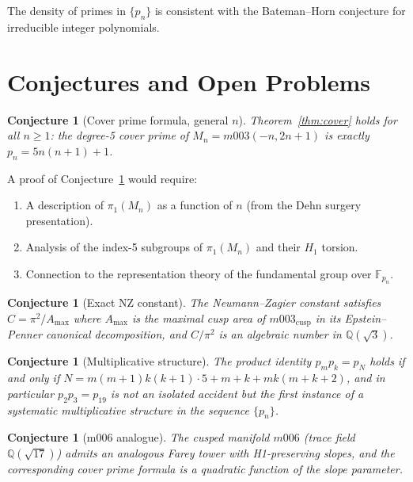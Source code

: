 \documentclass[11pt,a4paper]{article}
\newtheorem{conjecture}[theorem]{Conjecture}
\theoremstyle{definition}
\newcommand{\QQ}{\mathbb{Q}}
\newcommand{\Mn}{M_n}
\newcommand{\Mcusp}{m003_{\mathrm{cusp}}}
\begin{document}
The density of primes in $\{p_n\}$ is consistent with the
Bateman--Horn conjecture for irreducible integer polynomials.

\section{Conjectures and Open Problems}
\label{sec:conjectures}

\begin{conjecture}[Cover prime formula, general $n$]
\label{conj:main}
Theorem~\ref{thm:cover} holds for all $n \geq 1$:
the degree-5 cover prime of $\Mn = m003(-n,2n+1)$ is exactly
$p_n = 5n(n+1)+1$.
\end{conjecture}

A proof of Conjecture~\ref{conj:main} would require:
\begin{enumerate}
\item A description of $\pi_1(\Mn)$ as a function of $n$
  (from the Dehn surgery presentation).
\item Analysis of the index-5 subgroups of $\pi_1(\Mn)$
  and their $H_1$ torsion.
\item Connection to the representation theory of the
  fundamental group over $\mathbb{F}_{p_n}$.
\end{enumerate}

\begin{conjecture}[Exact NZ constant]
The Neumann--Zagier constant satisfies
$C = \pi^2\!/A_{\max}$ where $A_{\max}$ is the maximal cusp area
of $\Mcusp$ in its Epstein--Penner canonical decomposition,
and $C/\pi^2$ is an algebraic number in $\QQ(\sqrt{3})$.
\end{conjecture}

\begin{conjecture}[Multiplicative structure]
The product identity $p_m p_k = p_N$ holds if and only if
$N = m(m+1)k(k+1)\cdot 5 + m+k+mk(m+k+2)$, and in particular
$p_2 p_3 = p_{19}$ is not an isolated accident but the first
instance of a systematic multiplicative structure in the sequence
$\{p_n\}$.
\end{conjecture}

\begin{conjecture}[m006 analogue]
The cusped manifold $m006$ (trace field $\QQ(\sqrt{17})$)
admits an analogous Farey tower with H1-preserving slopes,
and the corresponding cover prime formula is a quadratic
function of the slope parameter.
\end{conjecture}
\end{document}

